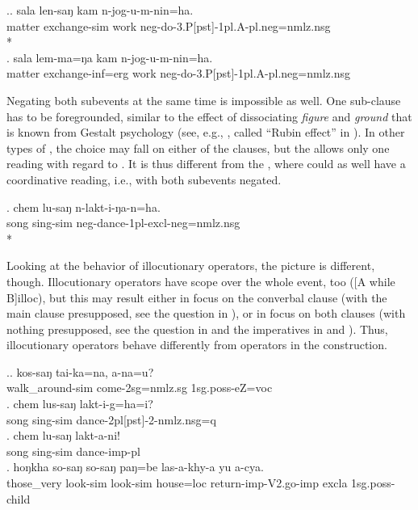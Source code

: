 \ex.\ag.	sala len-saŋ kam n-jog-u-m-nin=ha.\\
			matter exchange-{\sc sim} work {\sc neg-}do{\sc -3.P[pst]-1pl.A-pl.neg=nmlz.nsg}\\
			*\\
	\bg.	sala lem-ma=ŋa kam n-jog-u-m-nin=ha.\\
			matter exchange{\sc -inf=erg} work {\sc neg-}do{\sc -3.P[pst]-1pl.A-pl.neg=nmlz.nsg}\\
		
Negating both subevents at the same time is impossible as well. One sub-clause has to be foregrounded, similar to the effect of dissociating \emph{figure} and \emph{ground} that is known from Gestalt psychology (see, e.g., \citet{Jackendoff1983Semantics}, called “Rubin effect” in \citealt[48]{Bickel1991Typologische}). In other types of , the choice may fall on either of the clauses, but the  allows only one reading with regard to . It is thus different from the , where  could as well have a coordinative reading, i.e., with both subevents negated.

\exg.	chem lu-saŋ n-lakt-i-ŋa-n=ha.\\
		song sing-{\sc sim} {\sc neg-}dance{\sc -1pl-excl-neg=nmlz.nsg}\\
		*\\
		
		
Looking at the behavior of illocutionary operators, the picture is different, though. Illocutionary operators have scope over the whole event, too ([A while B]{\sc illoc}), but this may result either in focus on the converbal clause (with the main clause presupposed, see the question in \Next[a]), or in focus on both clauses (with nothing presupposed, see the question in \Next[b] and the imperatives in \Next[c] and \Next[d]). Thus, illocutionary operators behave differently from  operators in the  construction. 

\ex.\ag.	kos-saŋ tai-ka=na, a-na=u?\\
		walk\_around{\sc -sim} come{\sc [npst]-2sg=nmlz.sg} {\sc 1sg.poss-}eZ={\sc voc}\\
		  
\bg.	chem lus-saŋ lakt-i-g=ha=i?\\
		song   sing-{\sc sim} dance{\sc -2pl[pst]-2-nmlz.nsg=q}\\
\bg.	chem lu-saŋ lakt-a-ni!\\
		song   sing-{\sc sim} dance{\sc -imp-pl}\\
\bg. hoŋkha so-saŋ   so-saŋ   paŋ=be   las-a-khy-a     yu    a-cya.\\
 those\_very look{\sc -sim} look{\sc -sim} house{\sc =loc} return{\sc -imp-V2.go-imp}  {\sc excla}   {\sc 1sg.poss-}child\\
  

